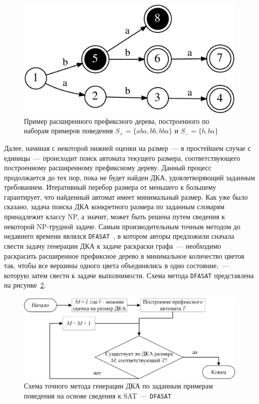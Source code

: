 \begin{figure}[ht]
  \centering
  \includegraphics[scale=0.14]{img/datamod/FIG2a.eps}
  \caption{Пример расширенного префиксного дерева, построенного по наборам примеров поведения $S_{+} = \{aba, bb, bba\}$ и $S_{-} = \{b, ba\}$}
  \label{syn:img:apta-ex}
\end{figure}

Далее, начиная с некоторой нижней оценки на размер~--- в простейшем случае с единицы~--- происходит поиск автомата текущего размера, соответствующего построенному расширенному префиксному дереву. 
Данный процесс продолжается до тех пор, пока не будет найден ДКА, удовлетворяющий заданным требованием.
Итеративный перебор размера от меньшего к большему гарантирует, что найденный автомат имеет минимальный размер.
Как уже было сказано, задача поиска ДКА конкретного размера по заданным словарям принадлежит классу NP, а значит, может быть решена путем сведения к некоторой NP-трудной задаче.
Самым производительным точным методом до недавнего времени являлся \texttt{DFASAT}~\cite{heule-icgi10}, в котором авторы предложили сначала свести задачу генерации ДКА к задаче раскраски графа~--- необходимо раскрасить расширенное префиксное дерево в минимальное количество цветов так, чтобы все вершины одного цвета объединялись в одно состояние,~--- которую затем свести к задаче выполнимости.
Схема метода \texttt{DFASAT} представлена на рисунке~\ref{syn:img:dfasat-algo}.

\begin{figure}[ht]
  \centering
  \includegraphics[scale=0.5]{img/ntv/basic.jpg}
  \caption{Схема точного метода генерации ДКА по заданным примерам поведения на основе сведения к SAT~--- \texttt{DFASAT}}
  \label{syn:img:dfasat-algo}
\end{figure}

